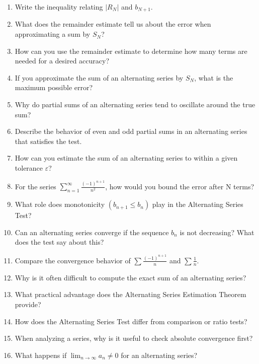 \begin{enumerate}
  \item Write the inequality relating \(|R_{N}|\) and \(b_{N+1}\).
  \item What does the remainder estimate tell us about the error when approximating a sum by \(S_{N}\)?
  \item How can you use the remainder estimate to determine how many terms are needed for a desired accuracy?
  \item If you approximate the sum of an alternating series by \(S_{N}\), what is the maximum possible error?
  \item Why do partial sums of an alternating series tend to oscillate around the true sum?
  \item Describe the behavior of even and odd partial sums in an alternating series that satisfies the test.
  \item How can you estimate the sum of an alternating series to within a given tolerance \(\varepsilon\)?
  \item For the series \(\sum_{n=1}^{\infty}\frac{(-1)^{n+1}}{n^{2}}\), how would you bound the error after N terms?
  \item What role does monotonicity \((b_{n+1}\le b_{n})\) play in the Alternating Series Test?
  \item Can an alternating series converge if the sequence \(b_{n}\) is not decreasing? What does the test say about this?
  \item Compare the convergence behavior of \(\sum \frac{(-1)^{n+1}}{n}\) and \(\sum \frac{1}{n}\).
  \item Why is it often difficult to compute the exact sum of an alternating series?
  \item What practical advantage does the Alternating Series Estimation Theorem provide?
  \item How does the Alternating Series Test differ from comparison or ratio tests?
  \item When analyzing a series, why is it useful to check absolute convergence first?
  \item What happens if \(\lim_{n \to \infty}a_{n} \neq 0\) for an alternating series?
\end{enumerate}

